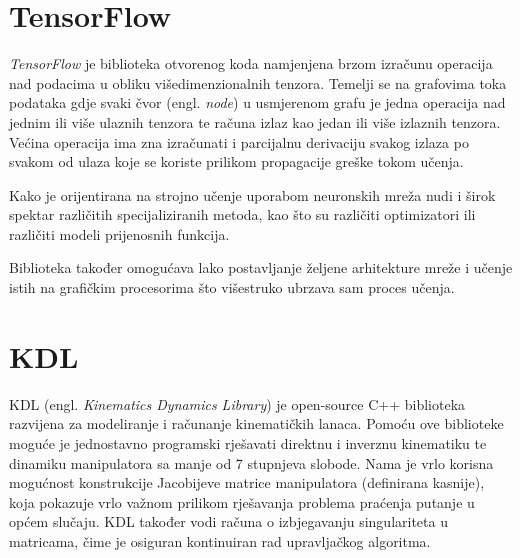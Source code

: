 \documentclass[times, utf8, diplomski, numeric]{fer}
\begin{document}
\section{TensorFlow}
\textit{TensorFlow} je biblioteka otvorenog koda namjenjena brzom izračunu operacija nad podacima u obliku višedimenzionalnih tenzora. Temelji se na grafovima toka podataka gdje svaki čvor (engl. \textit{node}) u usmjerenom grafu je jedna operacija nad jednim ili više ulaznih tenzora te računa izlaz kao jedan ili više izlaznih tenzora. Većina operacija ima zna izračunati i parcijalnu derivaciju svakog izlaza po svakom od ulaza koje se koriste prilikom propagacije greške tokom učenja. 

Kako je orijentirana na strojno učenje uporabom neuronskih mreža nudi i širok spektar različitih specijaliziranih metoda, kao što su različiti optimizatori ili različiti modeli prijenosnih funkcija.

Biblioteka također omogućava lako postavljanje željene arhitekture mreže i učenje istih na grafičkim procesorima što višestruko ubrzava sam proces učenja.

\section{KDL}
KDL (engl. \textit{Kinematics Dynamics Library}) je open-source C++ biblioteka razvijena za modeliranje i računanje kinematičkih lanaca.
Pomoću ove biblioteke moguće je jednostavno programski rješavati direktnu i inverznu kinematiku te dinamiku manipulatora sa manje od 7 stupnjeva slobode.
Nama je vrlo korisna mogućnost konstrukcije Jacobijeve matrice manipulatora (definirana kasnije), koja pokazuje vrlo važnom prilikom rješavanja problema praćenja putanje u općem slučaju.
KDL također vodi računa o izbjegavanju singulariteta u matricama, čime je osiguran kontinuiran rad upravljačkog algoritma.
\end{document}

